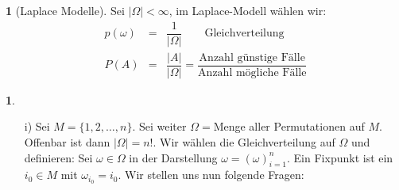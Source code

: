 \documentclass[10pt,a4paper]{report}
\numberwithin{equation}{section}
\numberwithin{figure}{section}
\theoremstyle{plain}
\theoremstyle{definition}
\newtheorem{example}[thm]{\protect\examplename}
\theoremstyle{remark}
\theoremstyle{plain}
\providecommand{\examplename}{Beispiel}
\newcommand{\1}{ \mathbb{1} } %
\begin{document}
\begin{example}[Laplace Modelle]
  Sei $|\Omega|<\infty$, im Laplace-Modell wählen wir:
  \begin{eqnarray*}
    p(\omega)&=&\dfrac{1}{|\Omega|} \qquad \text{Gleichverteilung}\\
    P(A)&=&\dfrac{|A|}{|\Omega|}=\dfrac{\text{Anzahl günstige Fälle}}{\text{Anzahl mögliche Fälle}}
  \end{eqnarray*}
\end{example}
\begin{example} \ %
  \begin{itemize}
  \item[i)] Sei $M=\{1,2,\dots,n\}$. Sei weiter $\Omega=$Menge aller Permutationen auf $M$. Offenbar ist dann $|\Omega|=n!$. Wir wählen die Gleichverteilung auf $\Omega$ und definieren:
    Sei $\omega \in \Omega$ in der Darstellung $\omega=(\omega)_{i=1}^n$. Ein Fixpunkt ist ein $i_0 \in M$ mit $\omega_{i_0}=i_0$.
    Wir stellen uns nun folgende Fragen:
    

\end{itemize}
\end{example}
\end{document}
